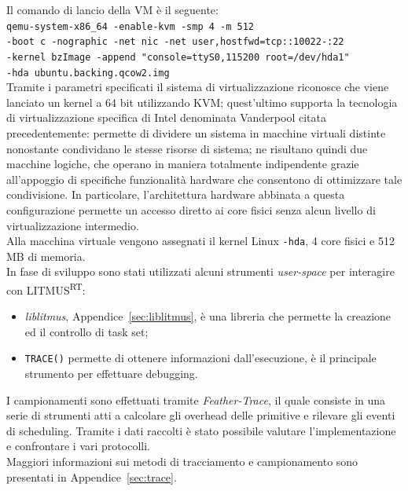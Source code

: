 \noindent Il comando di lancio della VM è il seguente:\\

\noindent \texttt{qemu-system-x86\_64 -enable-kvm -smp 4 -m 512 \\
-boot c -nographic -net nic -net user,hostfwd=tcp::10022-:22 \\
-kernel bzImage -append "console=ttyS0,115200 root=/dev/hda1" \\ 
-hda ubuntu.backing.qcow2.img}\\

\noindent Tramite i parametri specificati il sistema di virtualizzazione riconosce che viene lanciato un kernel a 64 bit utilizzando KVM; quest'ultimo supporta la tecnologia di virtualizzazione specifica di Intel denominata Vanderpool citata precedentemente: permette di dividere un sistema in macchine virtuali distinte nonostante condividano le stesse risorse di sistema; ne risultano quindi due macchine logiche, che operano in maniera totalmente indipendente grazie all'appoggio di specifiche funzionalità hardware che consentono di ottimizzare tale condivisione. In particolare, l'architettura hardware abbinata a questa configurazione permette un accesso diretto ai core fisici senza alcun livello di virtualizzazione intermedio.\\
Alla macchina virtuale vengono assegnati il kernel Linux \texttt{-hda}, 4 core fisici e 512 MB di memoria.\\

\noindent In fase di sviluppo sono stati utilizzati alcuni strumenti \textit{user-space} per interagire con LITMUS\textsuperscript{RT}:

\begin{itemize}
  \item \textit{liblitmus}, Appendice~\ref{sec:liblitmus}, è una libreria che permette la creazione ed il controllo di task set;
  \item \texttt{TRACE()} permette di ottenere informazioni dall'esecuzione, è il principale strumento per effettuare debugging.\\
\end{itemize}

\noindent I campionamenti sono effettuati tramite \textit{Feather-Trace}, il quale consiste in una serie di strumenti atti a calcolare gli overhead delle primitive e rilevare gli eventi di scheduling. Tramite i dati raccolti è stato possibile valutare l'implementazione e confrontare i vari protocolli.\\
Maggiori informazioni sui metodi di tracciamento e campionamento sono presentati in Appendice~\ref{sec:trace}.\\

